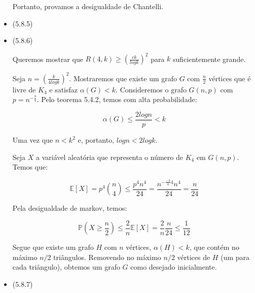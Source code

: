 \documentclass{article}
\begin{document}
\begin{itemize}
	      Portanto, provamos a desigualdade de Chantelli.


	\item (5.8.5)
	\item (5.8.6)

	      Queremos mostrar que \(R(4, k) \geq (\frac{ck}{log k})^2\) para \(k\) suficientemente grande.

	      Seja \(n = (\frac{k}{4 log k})^2\). Mostraremos que existe um grafo \(G\) com \(\frac{n}{2}\) vértices que é livre de \(K_4\) e satisfaz \(\alpha(G) < k\).
	      Consideremos o grafo \(G(n,p)\) com \(p = n^{-\frac{3}{4}}\). Pelo teorema 5.4.2, temos com alta probabilidade:

	      \[\alpha(G) \leq \frac{2 log n}{p} < k\]

	      Uma vez que \(n < k^2\) e, portanto, \(log n < 2 log k\).

	      Seja \(X\) a variável aleatória que representa o número de \(K_4\) em \(G(n, p)\). Temos que:

	      \[\mathbb{E}[X] = p^4 \binom{n}{4} \leq \frac{p^4 n^4}{24} = \frac{n^{-\frac{-3}{4} 4} n ^ 4}{24} = \frac{n}{24}\]

	      Pela desigualdade de markov, temos:

	      \[\mathbb{P}(X \geq \frac{n}{2}) \leq \frac{2}{n}\mathbb{E}[X]  = \frac{2}{n} \frac{n}{24} \leq \frac{1}{12}\]

	      Segue que existe um grafo \(H\) com \(n\) vértices, \(\alpha(H) < k\), que contém no
	      máximo \(n/2\) triângulos. Removendo no máximo \(n/2\) vértices de \(H\) (um para
	      cada triângulo), obtemos um grafo \(G\) como desejado inicialmente.

	\item (5.8.7)
\end{itemize}

\end{document}
